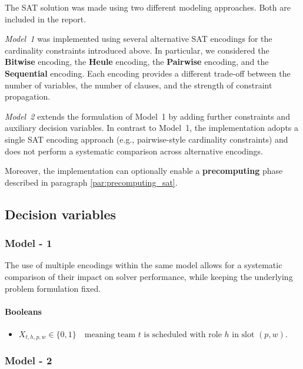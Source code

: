 The SAT solution was made using two different modeling approaches. Both are included in the report. 

\vspace{1em}
\textit{Model~1} was implemented using several alternative SAT encodings for the cardinality
constraints introduced above. In particular, we considered the \textbf{Bitwise} encoding,
the \textbf{Heule} encoding, the \textbf{Pairwise} encoding, and the \textbf{Sequential} encoding.
Each encoding provides a different trade-off between the number of variables,
the number of clauses, and the strength of constraint propagation.

\vspace{1em}
\textit{Model~2} extends the formulation of Model~1 by adding further constraints and auxiliary decision variables. In contrast to Model~1, the implementation adopts a single SAT encoding approach (e.g., pairwise-style cardinality constraints) and does not perform a systematic comparison across alternative encodings.  

Moreover, the implementation can optionally enable a \textbf{precomputing} phase described in paragraph \ref{par:precomputing_sat}.





\subsection{Decision variables}

\subsubsection{Model - 1}

The use of multiple encodings within the same model allows for a systematic
comparison of their impact on solver performance, while keeping the underlying
problem formulation fixed.

\paragraph{Booleans}

\begin{itemize}
    \item  $ X_{t,h,p,w}\in\{0,1\} \quad\text{meaning team }t\text{ is scheduled with role }h\text{ in slot }(p,w). $
\end{itemize}

\subsubsection{Model - 2}

